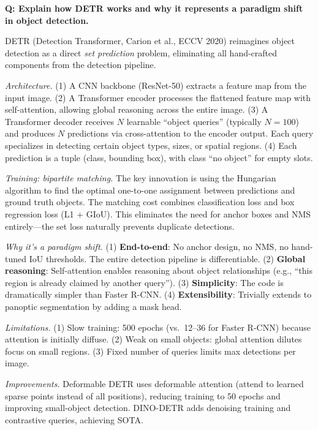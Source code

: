 \begin{interviewq}
\textbf{Q: Explain how DETR works and why it represents a paradigm shift in object detection.}

 \quad {} \quad \badgefreq{\freqhigh}

\stronganswer DETR (Detection Transformer, Carion et al., ECCV 2020) reimagines object detection as a direct \textit{set prediction} problem, eliminating all hand-crafted components from the detection pipeline.

\textit{Architecture.} (1) A CNN backbone (ResNet-50) extracts a feature map from the input image. (2) A Transformer encoder processes the flattened feature map with self-attention, allowing global reasoning across the entire image. (3) A Transformer decoder receives $N$ learnable ``object queries'' (typically $N = 100$) and produces $N$ predictions via cross-attention to the encoder output. Each query specializes in detecting certain object types, sizes, or spatial regions. (4) Each prediction is a tuple (class, bounding box), with class ``no object'' for empty slots.

\textit{Training: bipartite matching.} The key innovation is using the Hungarian algorithm to find the optimal one-to-one assignment between predictions and ground truth objects. The matching cost combines classification loss and box regression loss (L1 + GIoU). This eliminates the need for anchor boxes and NMS entirely---the set loss naturally prevents duplicate detections.

\textit{Why it's a paradigm shift.} (1) \textbf{End-to-end}: No anchor design, no NMS, no hand-tuned IoU thresholds. The entire detection pipeline is differentiable. (2) \textbf{Global reasoning}: Self-attention enables reasoning about object relationships (e.g., ``this region is already claimed by another query''). (3) \textbf{Simplicity}: The code is dramatically simpler than Faster R-CNN. (4) \textbf{Extensibility}: Trivially extends to panoptic segmentation by adding a mask head.

\textit{Limitations.} (1) Slow training: 500 epochs (vs.\ 12--36 for Faster R-CNN) because attention is initially diffuse. (2) Weak on small objects: global attention dilutes focus on small regions. (3) Fixed number of queries limits max detections per image.

\textit{Improvements.} Deformable DETR uses deformable attention (attend to learned sparse points instead of all positions), reducing training to 50 epochs and improving small-object detection. DINO-DETR adds denoising training and contrastive queries, achieving SOTA.


\end{interviewq}
